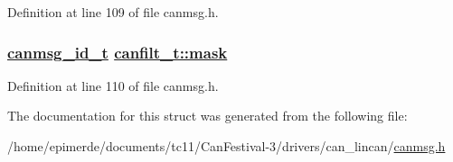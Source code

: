 Definition at line 109 of file canmsg.h.\hypertarget{structcanfilt__t_0b1650e86282ed67271c33475c9aa72a}{
\subsubsection[mask]{\setlength{\rightskip}{0pt plus 5cm}\hyperlink{canmsg_8h_4df2eff676652dbe67d372e42ccf8aa7}{canmsg\_\-id\_\-t} \hyperlink{structcanfilt__t_0b1650e86282ed67271c33475c9aa72a}{canfilt\_\-t::mask}}}
\label{structcanfilt__t_0b1650e86282ed67271c33475c9aa72a}




Definition at line 110 of file canmsg.h.

The documentation for this struct was generated from the following file:\begin{CompactItemize}
\item 
/home/epimerde/documents/tc11/Can\-Festival-3/drivers/can\_\-lincan/\hyperlink{canmsg_8h}{canmsg.h}\end{CompactItemize}

